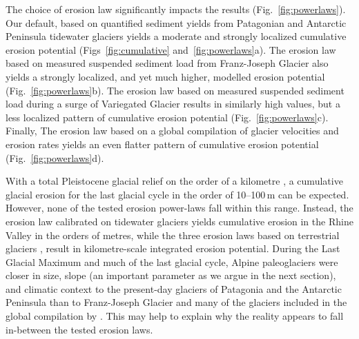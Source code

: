 \documentclass[esurf, manuscript]{copernicus}
\begin{document}
    The choice of erosion law significantly impacts the results
    (Fig.~\ref{fig:powerlaws}). Our default, based on quantified
    sediment yields from Patagonian and Antarctic Peninsula tidewater glaciers
    \citep[${\dot{e}=5.2\times10^{-8}u_\mathrm{b}^{2.34}}$,][]{Koppes.etal.2015}
    yields a moderate and strongly localized cumulative erosion potential
    (Figs~\ref{fig:cumulative} and~\ref{fig:powerlaws}a). The erosion law
    based on measured suspended sediment load from Franz-Joseph Glacier
    \citep[${\dot{e}=2.7\times10^{-7}u_\mathrm{b}^{2.02}}$,][]{Herman.etal.2015}
    also yields a strongly localized, and yet much higher, modelled erosion
    potential (Fig.~\ref{fig:powerlaws}b). The erosion law based on measured
    suspended sediment load during a surge of Variegated Glacier
    \citep[${\dot{e}=1\times10^{-4}u_\mathrm{b}^{1}}$,][]{Humphrey.Raymond.1994}
    results in similarly high values, but a less localized pattern of cumulative
    erosion potential (Fig.~\ref{fig:powerlaws}c). Finally, The erosion law
    based on a global compilation of glacier velocities and erosion rates
    \citep[${\dot{e}=1.665\times10^{-1}u_\mathrm{b}^{0.6459}}$,][]{Cook.etal.2020}
    yields an even flatter pattern of cumulative erosion potential
    (Fig.~\ref{fig:powerlaws}d).

    With a total Pleistocene glacial relief on the order of a kilometre
    \citep{Preusser.etal.2011, Valla.etal.2011}, a cumulative glacial erosion
    for the last glacial cycle in the order of 10--100\,m can be expected.
    However, none of the tested erosion power-laws fall within this range.
    Instead, the erosion law calibrated on tidewater glaciers
    \citep{Koppes.etal.2015} yields cumulative erosion in the Rhine Valley in
    the orders of metres, while the three erosion laws based on terrestrial
    glaciers \citep{Humphrey.Raymond.1994, Herman.etal.2015, Cook.etal.2020},
    result in kilometre-scale integrated erosion potential. During the Last
    Glacial Maximum and much of the last glacial cycle, Alpine paleoglaciers
    were closer in size, slope (an important parameter as we argue in the next
    section), and climatic context to the present-day glaciers of
    Patagonia and the Antarctic Peninsula \citep{Koppes.etal.2015} than to
    Franz-Joseph Glacier \citep{Herman.etal.2015} and many of the glaciers
    included in the global compilation by \citet{Cook.etal.2020}.
    This may help to explain why the reality appears to fall in-between the
    tested erosion laws.
\end{document}
